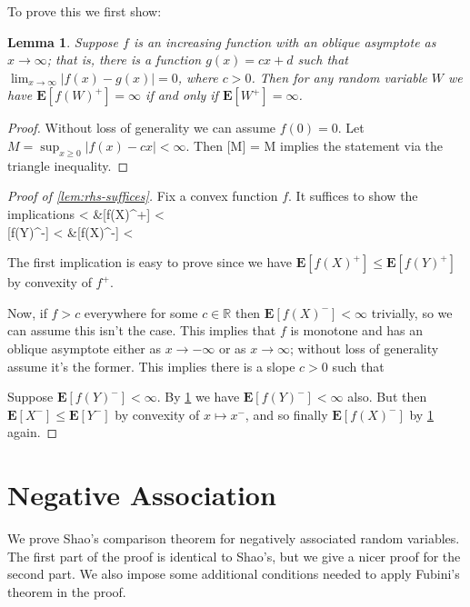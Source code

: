 \documentclass{article}
\newtheorem{lemma}[theorem]{Lemma}
\newcommand*{\R}[0]{\mathbb{R}}
\newcommand*{\E}[0]{\mathbf{E}}
\def\[#1\]{\begin{align*}#1\end{align*}}
\begin{document}
To prove this we first show:

\begin{lemma}\label{lem:asymptote}
  Suppose $f$ is an increasing function with an oblique asymptote as $x \to \infty$;
  that is, there is a function $g(x) = cx + d$ such that $\lim_{x \to \infty} |f(x) - g(x)| = 0$, where $c > 0$.
  Then for any random variable $W$ we have $\E[f(W)^+] = \infty$ if and only if $\E[W^+] = \infty$.
\end{lemma}
\begin{proof}
  Without loss of generality we can assume $f(0) = 0$.
  Let $M = \sup_{x \ge 0} |f(x) - cx| < \infty$.
  Then \[\E[|f(W)^+ - cW^+|] \le \E[M] = M\]
  implies the statement via the triangle inequality.
\end{proof}

\begin{proof}[Proof of \cref{lem:rhs-suffices}]
  Fix a convex function $f$.
  It suffices to show the implications
  \[
  \E[f(Y)^+] < \infty &\to \E[f(X)^+] < \infty \\
  \E[f(Y)^-] < \infty &\to \E[f(X)^-] < \infty \\
  \]

  The first implication is easy to prove since we have $\E[f(X)^+] \le \E[f(Y)^+]$
  by convexity of $f^+$.

  Now, if $f > c$ everywhere for some $c \in \R$ then $\E[f(X)^-] < \infty$ trivially, so we can assume this isn't the case.
  This implies that $f$ is monotone and has an oblique asymptote either as $x \to -\infty$ or as $x \to \infty$; without loss of generality assume it's the former.
  This implies there is a slope $c > 0$ such that
  

  Suppose $\E[f(Y)^-] < \infty$.  By \cref{lem:asymptote} we have $\E[f(Y)^-] < \infty$ also.
  But then $\E[X^-] \le \E[{Y}^-]$ by convexity of $x \mapsto x^-$,
  and so finally $\E[f(X)^-]$ by \cref{lem:asymptote} again.
\end{proof}


\section*{Negative Association}


We prove Shao's comparison theorem for negatively associated random variables.  The first part of the proof is identical to Shao's, but we give a nicer proof for the second part.  We also impose some additional conditions needed to apply Fubini's theorem in the proof.
\end{document}
